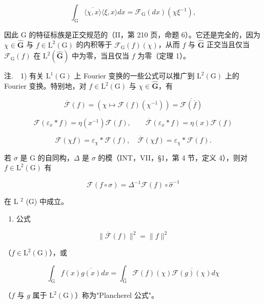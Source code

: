 \[
\int_ {\mathrm{G}} \overline {{\langle \chi , x \rangle}} \langle \xi , x \rangle d x = \mathcal {F} _ {\mathrm{G}} (d x) (\chi \xi^ {- 1}),
\]

因此 G 的特征标族是正交规范的（II，第 210 页，命题 6）。它还是完全的，因为 \(\chi \in \widehat{\mathbf{G}}\) 与 \(f \in \mathrm{L}^2(\mathrm{G})\) 的内积等于 \(\mathcal{F}_{\mathrm{G}}(f)(\chi)\)，从而 \(f\) 与 \(\widehat{\mathbf{G}}\) 正交当且仅当 \(\mathcal{F}_{\mathrm{G}}(f)\) 在 \(\mathrm{L}^2(\widehat{\mathbf{G}})\) 中为零，当且仅当 \(f\) 为零（定理 1）。

注.　1) 有关 \(\mathrm{L}^{1}(\mathrm{G})\) 上 Fourier 变换的一些公式可以推广到 \(\mathrm{L}^{2}(\mathrm{G})\) 上的 Fourier 变换。特别地，对 \(f \in \mathrm{L}^{2}(\mathrm{G})\) 与 \(\chi \in \widehat{\mathbf{G}}\)，有

\[
\overline {{\mathcal {F}}} (f) = (\chi \mapsto \mathcal {F} (f) (\chi^ {- 1})) = \overline {{\mathcal {F} (\overline {{f}})}}
\]

\[
\mathcal {F} (\varepsilon_ {x} * f) = \eta (x ^ {- 1}) \mathcal {F} (f), \qquad \overline {{\mathcal {F}}} (\varepsilon_ {x} * f) = \eta (x) \mathcal {F} (f)
\]

\[
\mathcal {F} (\chi f) = \varepsilon_ {\chi} * \mathcal {F} (f), \quad \overline {{\mathcal {F}}} (\chi f) = \varepsilon_ {\chi} * \mathcal {F} (f).
\]

若 \(\sigma\) 是 G 的自同构，\(\Delta\) 是 \(\sigma\) 的模（INT，VII，§1，第 4 节，定义 4），则对 \(f \in \mathrm{L}^2(\mathrm{G})\) 有

\[
\mathcal {F} (f \circ \sigma) = \Delta^ {- 1} \mathcal {F} (f) \circ \widehat {\sigma} ^ {- 1}
\]

在 L \(^{2}\) (G) 中成立。

\begin{enumerate}
\def\labelenumi{\arabic{enumi})}
\setcounter{enumi}{1}
\tightlist
\item
  公式
\end{enumerate}

\[
\| \overline {{\mathcal {F}}} (f) \| ^ {2} = \| f \| ^ {2}\tag{23}
\]

（\(f\in \mathrm{L}^2 (\mathrm{G})\)），或

\[
\int_ {\mathrm{G}} f (x) \overline {{g (x)}} d x = \int_ {\widehat {\mathrm{G}}} \mathcal {F} (f) (\chi) \overline {{\mathcal {F} (g) (\chi)}} d \chi\tag{24}
\]

（\(f\) 与 \(g\) 属于 \(\mathrm{L}^2 (\mathrm{G})\)）称为"Plancherel 公式"。

